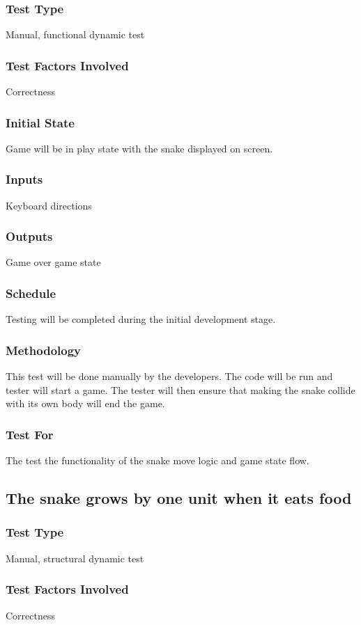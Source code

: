 \documentclass[12pt]{article}
\begin{document}
\subsubsection*{Test Type}
Manual, functional dynamic test
\subsubsection*{Test Factors Involved}
Correctness
\subsubsection*{Initial State}
Game will be in play state with the snake displayed on screen.
\subsubsection*{Inputs}
Keyboard directions
\subsubsection*{Outputs}
Game over game state
\subsubsection*{Schedule}
Testing will be completed during the initial development stage.
\subsubsection*{Methodology}
This test will be done manually by the developers. The code will be run and tester will start a game. The tester will then ensure that making the snake collide with its own body will end the game.
\subsubsection*{Test For}
The test the functionality of the snake move logic and game state flow. \newline

\noindent
\subsection{The snake grows by one unit when it eats food}
\subsubsection*{Test Type}
Manual, structural dynamic test
\subsubsection*{Test Factors Involved}
Correctness
\end{document}
